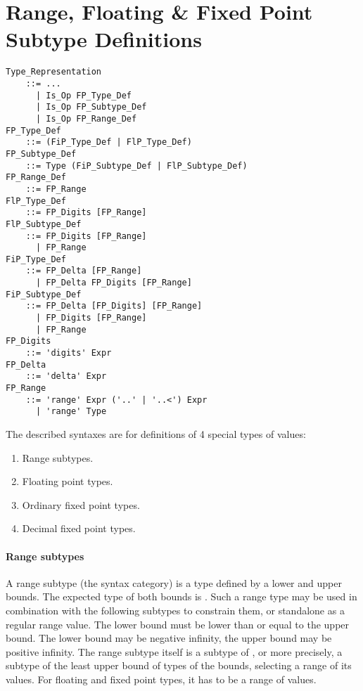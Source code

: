 \section{Range, Floating \& Fixed Point Subtype Definitions}
\label{sec:fl-fi-subtypes}

\grammar\begin{lstlisting}
Type_Representation 
    ::= ...
      | Is_Op FP_Type_Def
      | Is_Op FP_Subtype_Def 
      | Is_Op FP_Range_Def
FP_Type_Def
    ::= (FiP_Type_Def | FlP_Type_Def) 
FP_Subtype_Def 
    ::= Type (FiP_Subtype_Def | FlP_Subtype_Def) 
FP_Range_Def
    ::= FP_Range
FlP_Type_Def 
    ::= FP_Digits [FP_Range]
FlP_Subtype_Def 
    ::= FP_Digits [FP_Range]
      | FP_Range
FiP_Type_Def 
    ::= FP_Delta [FP_Range] 
      | FP_Delta FP_Digits [FP_Range]
FiP_Subtype_Def
    ::= FP_Delta [FP_Digits] [FP_Range]
      | FP_Digits [FP_Range]
      | FP_Range
FP_Digits
    ::= 'digits' Expr
FP_Delta 
    ::= 'delta' Expr
FP_Range 
    ::= 'range' Expr ('..' | '..<') Expr
      | 'range' Type
\end{lstlisting}

The described syntaxes are for definitions of 4 special types of values:
\begin{enumerate}
  \item Range subtypes.
  \item Floating point types. 
  \item Ordinary fixed point types. 
  \item Decimal fixed point types. 
\end{enumerate}

\paragraph{Range subtypes}
A range subtype (the  syntax category) is a type defined by a lower and upper bounds. The expected type of both bounds is . Such a range type may be used in combination with the following subtypes to constrain them, or standalone as a regular range value. The lower bound must be lower than or equal to the upper bound. The lower bound may be negative infinity, the upper bound may be positive infinity. The range subtype itself is a subtype of , or more precisely, a subtype of the least upper bound of types of the bounds, selecting a range of its values. For floating and fixed point types, it has to be a range of  values. 

